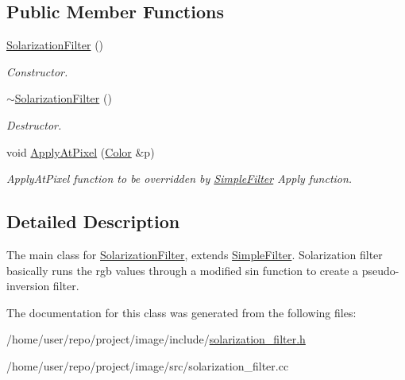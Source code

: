 \subsection*{Public Member Functions}
\begin{DoxyCompactItemize}
\item 
\mbox{\label{classSolarizationFilter_a3962aa863451ddb62f8be68a4fba3b05}} 
\hyperlink{classSolarizationFilter_a3962aa863451ddb62f8be68a4fba3b05}{Solarization\+Filter} ()
\begin{DoxyCompactList}\small\item\em Constructor. \end{DoxyCompactList}\item 
\mbox{\label{classSolarizationFilter_aa990626b72985179d6daa691650d2137}} 
\hyperlink{classSolarizationFilter_aa990626b72985179d6daa691650d2137}{$\sim$\+Solarization\+Filter} ()
\begin{DoxyCompactList}\small\item\em Destructor. \end{DoxyCompactList}\item 
\mbox{\label{classSolarizationFilter_ad976506b14f3dee20940499ec77205c1}} 
void \hyperlink{classSolarizationFilter_ad976506b14f3dee20940499ec77205c1}{Apply\+At\+Pixel} (\hyperlink{classColor}{Color} \&p)
\begin{DoxyCompactList}\small\item\em Apply\+At\+Pixel function to be overridden by \hyperlink{classSimpleFilter}{Simple\+Filter} Apply function. \end{DoxyCompactList}\end{DoxyCompactItemize}


\subsection{Detailed Description}
The main class for \hyperlink{classSolarizationFilter}{Solarization\+Filter}, extends \hyperlink{classSimpleFilter}{Simple\+Filter}. Solarization filter basically runs the rgb values through a modified sin function to create a pseudo-\/inversion filter. 

The documentation for this class was generated from the following files\+:\begin{DoxyCompactItemize}
\item 
/home/user/repo/project/image/include/\hyperlink{solarization__filter_8h}{solarization\+\_\+filter.\+h}\item 
/home/user/repo/project/image/src/solarization\+\_\+filter.\+cc\end{DoxyCompactItemize}
